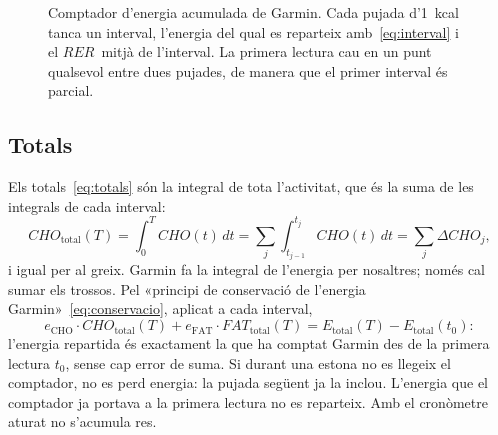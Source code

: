 \documentclass[10pt,a4paper]{article}
\newcommand{\sub}[1]{{\scriptscriptstyle\mathrm{#1}}}   %
\newcommand{\CHO}{\sub{CHO}}
\newcommand{\FAT}{\sub{FAT}}
\newcommand{\tot}{\sub{total}}
\newcommand{\cho}{\ensuremath{\mathit{CHO}}}               %
\newcommand{\fat}{\ensuremath{\mathit{FAT}}}
\newcommand{\RER}{\ensuremath{\mathit{RER}}}
\begin{document}
\begin{figure}[H]
\centering
{}
\caption{Comptador d'energia acumulada de Garmin. Cada pujada d'1~kcal tanca un interval,
l'energia del qual es reparteix amb~\eqref{eq:interval} i el \RER\ mitjà de l'interval. La
primera lectura cau en un punt qualsevol entre dues pujades, de manera que el primer
interval és parcial.}
\label{fig:comptador}
\end{figure}

\subsection{Totals}
Els totals~\eqref{eq:totals} són la integral de tota l'activitat, que és la suma de les
integrals de cada interval:
\begin{equation}
  \cho_{\tot}(T)=\int_0^T\cho(t)\,dt=\sum_j\int_{t_{j-1}}^{t_j}\cho(t)\,dt=\sum_j\Delta\cho_j ,
\end{equation}
i igual per al greix. Garmin fa la integral de l'energia per nosaltres; només cal sumar els
trossos.
Pel «principi de conservació de l'energia Garmin»~\eqref{eq:conservacio}, aplicat a cada
interval,
\begin{equation}
  e_{\CHO}\cdot\cho_{\tot}(T)+e_{\FAT}\cdot\fat_{\tot}(T)=E_{\tot}(T)-E_{\tot}(t_0):
\end{equation}
l'energia repartida és exactament la que ha comptat Garmin des de la primera lectura $t_0$,
sense cap error de suma. Si durant una estona no es llegeix el comptador, no es perd
energia: la pujada següent ja la inclou. L'energia que el comptador ja portava a la primera
lectura no es reparteix. Amb el cronòmetre aturat no s'acumula res.
\end{document}
